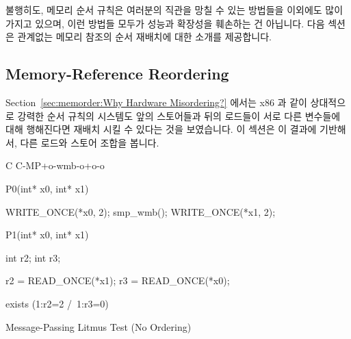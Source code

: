 불행히도, 메모리 순서 규칙은 여러분의 직관을 망칠 수 있는 방법들을 이외에도
많이 가지고 있으며, 이런 방법들 모두가 성능과 확장성을 훼손하는 건 아닙니다.
다음 섹션은 관계없는 메모리 참조의 순서 재배치에 대한 소개를 제공합니다.

\subsection{Memory-Reference Reordering}
\label{sec:memorder:Memory-Reference Reordering}

Section~\ref{sec:memorder:Why Hardware Misordering?}
에서는 x86 과 같이 상대적으로 강력한 순서 규칙의 시스템도 앞의 스토어들과
뒤의 로드들이 서로 다른 변수들에 대해 행해진다면 재배치 시킬 수 있다는 것을
보였습니다.
이 섹션은 이 결과에 기반해서, 다른 로드와 스토어 조합을 봅니다.

\begin{listing}[tbp]
{ \scriptsize
\begin{verbbox}[\LstLineNo]
C C-MP+o-wmb-o+o-o

{
}


P0(int* x0, int* x1) {

  WRITE_ONCE(*x0, 2);
  smp_wmb();
  WRITE_ONCE(*x1, 2);

}

P1(int* x0, int* x1) {

  int r2;
  int r3;

  r2 = READ_ONCE(*x1);
  r3 = READ_ONCE(*x0);

}

exists (1:r2=2 /\ 1:r3=0)
\end{verbbox}
}
\centering
\theverbbox
\caption{Message-Passing Litmus Test (No Ordering)}
\label{lst:memorder:Message-Passing Litmus Test (No Ordering)}
\end{listing}


